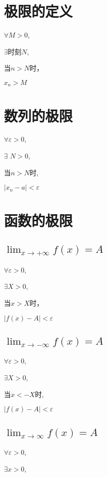 \documentclass{article}
\begin{document}
  
    \section{极限的定义} 

    $\forall$$M>0$,

    $\exists$时刻$N$, 

    当$n>N$时，

    $x_n>M$

    \section{数列的极限}

    $\forall \varepsilon>0$, 

    $\exists$ $N>0$, 

    当$n>N$时, 

    $\left | x_n-a \right | <\varepsilon$

    \section{函数的极限}

    \subsection{$\lim_{x \to +\infty} f(x) = A$}

    $\forall \varepsilon>0$, 

    $\exists X>0$, 

    当$x>X$时，

    $\left| f(x)-A \right| <\varepsilon $ 

    \subsection{$\lim_{x \to -\infty} f(x) = A$}

    $\forall \varepsilon>0$, 

    $\exists X>0$, 

    当$x<-X$时, 

    $\left| f(x) - A \right| < \varepsilon$

    \subsection{$ \lim_{x \to \infty} f(x) = A$}

    $\forall \varepsilon >0$, 

    $\exists x>0$, 
\end{document}
